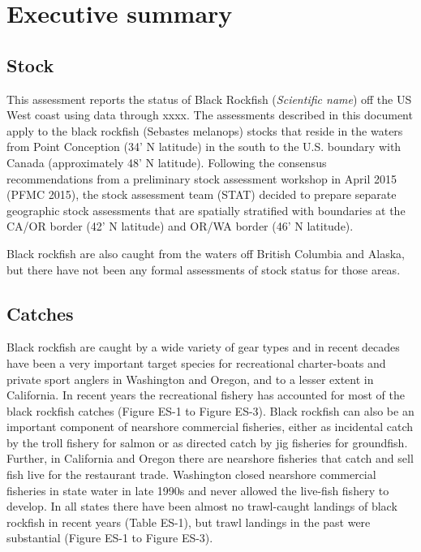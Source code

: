 \documentclass[11pt,
  english,
  letterpaper,
]{article}
\begin{document}
\newcommand{\lt}{\ensuremath <}
\newcommand{\gt}{\ensuremath >}

\pagebreak
{}
\setcounter{page}{1}

\renewcommand{\thetable}{\roman{table}}
\renewcommand{\thefigure}{\roman{figure}}

\setlength\parskip{0.5em plus 0.1em minus 0.2em}

\hypertarget{executive-summary}{%
\section*{Executive summary}\label{executive-summary}}

\hypertarget{stock}{%
\subsection*{Stock}\label{stock}}

This assessment reports the status of Black Rockfish (\emph{Scientific name}) off the US West coast using data through xxxx. The assessments described in this document apply to the black rockfish (Sebastes melanops) stocks that reside in the waters from Point Conception (34' N latitude) in the south to the U.S. boundary with Canada (approximately 48' N latitude). Following the consensus recommendations from a preliminary stock assessment workshop in April 2015 (PFMC 2015), the stock assessment team (STAT) decided to prepare separate geographic stock assessments that are spatially stratified with boundaries at the CA/OR border (42' N latitude) and OR/WA border (46' N latitude).

Black rockfish are also caught from the waters off British Columbia and Alaska, but there have not been any formal assessments of stock status for those areas.

\hypertarget{catches}{%
\subsection*{Catches}\label{catches}}

Black rockfish are caught by a wide variety of gear types and in recent decades have been a very important target species for recreational charter-boats and private sport anglers in Washington and Oregon, and to a lesser extent in California. In recent years the recreational fishery has accounted for most of the black rockfish catches (Figure ES-1 to Figure ES-3). Black rockfish can also be an important component of nearshore commercial fisheries, either as incidental catch by the troll fishery for salmon or as directed catch by jig fisheries for groundfish. Further, in California and Oregon there are nearshore fisheries that catch and sell fish live for the restaurant trade. Washington closed nearshore commercial fisheries in state water in late 1990s and never allowed the live-fish fishery to develop. In all states there have been almost no trawl-caught landings of black rockfish in recent years (Table ES-1), but trawl landings in the past were substantial (Figure ES-1 to Figure ES-3).
\end{document}
